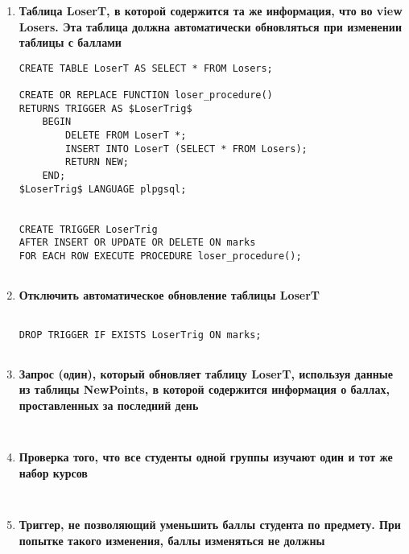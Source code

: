 \documentclass[12pt]{article}
\begin{document}
\begin{enumerate}
\begin{lstlisting}
     \end{lstlisting}     
     
     \item \textbf{Таблица LoserT, в которой содержится та же информация, что во view Losers. Эта таблица должна автоматически обновляться при изменении таблицы с баллами}

     \begin{lstlisting}     
CREATE TABLE LoserT AS SELECT * FROM Losers;

CREATE OR REPLACE FUNCTION loser_procedure() 
RETURNS TRIGGER AS $LoserTrig$
    BEGIN
		DELETE FROM LoserT *;
		INSERT INTO LoserT (SELECT * FROM Losers);
		RETURN NEW;
    END;
$LoserTrig$ LANGUAGE plpgsql;


CREATE TRIGGER LoserTrig
AFTER INSERT OR UPDATE OR DELETE ON marks
FOR EACH ROW EXECUTE PROCEDURE loser_procedure();
     
     \end{lstlisting}     

     \item \textbf{Отключить автоматическое обновление таблицы LoserT}
     
     \begin{lstlisting}     
     
DROP TRIGGER IF EXISTS LoserTrig ON marks;
     
     \end{lstlisting}     
     
     \item \textbf{Запрос (один), который обновляет таблицу LoserT, используя данные из таблицы NewPoints, в которой содержится информация о баллах, проставленных за последний день}
     
     \begin{lstlisting}     
     
     \end{lstlisting}     
     
     \item \textbf{Проверка того, что все студенты одной группы изучают один и тот же набор курсов}

	
     \begin{lstlisting}     
     
     \end{lstlisting}     

     \item \textbf{Триггер, не позволяющий уменьшить баллы студента по предмету. При попытке такого изменения, баллы изменяться не должны} 		                         		               		                                        		               		                         		               		     	
     \begin{lstlisting}     


\end{lstlisting}
\end{enumerate}
\end{document}
